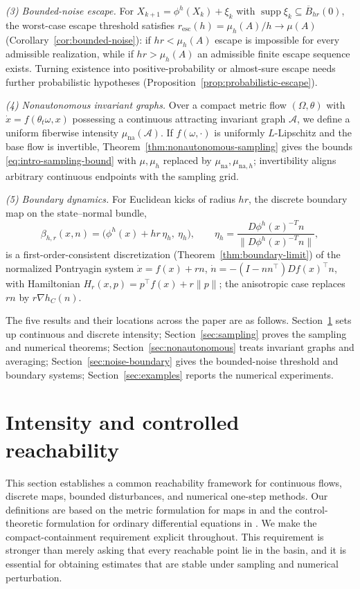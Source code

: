 \documentclass[pdflatex,sn-mathphys-num]{sn-jnl}
\numberwithin{equation}{section}
\theoremstyle{thmstyleone}%
\theoremstyle{definition}
\theoremstyle{remark}
\begin{document}
\emph{(3) Bounded-noise escape.} For $X_{k+1}=\phi^h(X_k)+\xi_k$ with $\operatorname{supp}\xi_k\subseteq \overline B_{hr}(0)$, the worst-case escape threshold satisfies $r_{\mathrm{esc}}(h)=\mu_h(A)/h\to\mu(A)$
(Corollary~\ref{cor:bounded-noise}): if $hr<\mu_h(A)$ escape is impossible for every admissible realization, while if $hr>\mu_h(A)$ an admissible finite escape sequence exists. Turning existence into positive-probability or almost-sure escape needs further probabilistic hypotheses (Proposition~\ref{prop:probabilistic-escape}).

\emph{(4) Nonautonomous invariant graphs.} Over a compact metric flow $(\Omega,\theta)$ with $\dot x=f(\theta_t\omega,x)$ possessing a continuous attracting invariant graph $\mathcal A$, we define a uniform fiberwise intensity $\mu_{\mathrm{na}}(\mathcal A)$. If $f(\omega,\cdot)$ is uniformly $L$-Lipschitz and the base flow is invertible, Theorem~\ref{thm:nonautonomous-sampling} gives the bounds \eqref{eq:intro-sampling-bound} with $\mu,\mu_h$ replaced by
$\mu_{\mathrm{na}},\mu_{\mathrm{na},h}$; invertibility aligns arbitrary continuous endpoints with the sampling grid.

\emph{(5) Boundary dynamics.} For Euclidean kicks of radius $hr$, the discrete boundary map on the state--normal bundle,
\[
    \beta_{h,r}(x,n)
    =\bigl(\phi^h(x)+hr\,\eta_h,\ \eta_h\bigr),
    \qquad
    \eta_h=\frac{D\phi^h(x)^{-T}n}{\|D\phi^h(x)^{-T}n\|},
\]
is a first-order-consistent discretization (Theorem~\ref{thm:boundary-limit}) of the normalized Pontryagin system $\dot x=f(x)+rn$, $\dot n=-(I-nn^\top)Df(x)^\top n$, with Hamiltonian $H_r(x,p)=p^\top f(x)+r\|p\|$; the anisotropic case replaces $rn$ by $r\nabla h_C(n)$.

The five results and their locations across the paper are as follows. Section~\ref{sec:intensity} sets up continuous and discrete intensity; Section~\ref{sec:sampling} proves the sampling and numerical theorems; Section~\ref{sec:nonautonomous} treats invariant graphs and averaging; Section~\ref{sec:noise-boundary} gives the bounded-noise threshold and boundary systems; Section~\ref{sec:examples} reports the numerical experiments. 

\section{Intensity and controlled reachability}
\label{sec:intensity}

This section establishes a common reachability framework for continuous flows, discrete maps, bounded disturbances, and numerical one-step methods. Our definitions are based on the metric formulation for maps in \citep{mcgehee1988some} and the control-theoretic formulation for ordinary differential equations in \citep{meyer2022intensity}. We make the compact-containment requirement explicit throughout. This requirement is stronger than merely asking that every reachable point lie in the basin, and it is essential for obtaining estimates that are stable under sampling and numerical perturbation.
\end{document}
